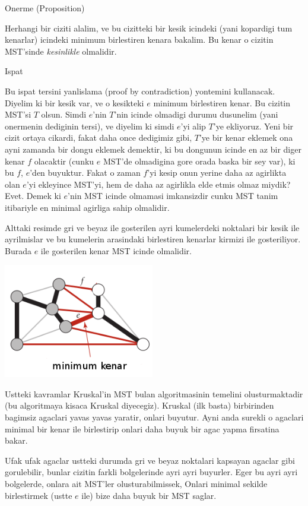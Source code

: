 \documentclass[12pt,fleqn]{article}\usepackage{../common}
\begin{document}
Onerme (Proposition)

Herhangi bir ciziti alalim, ve bu cizitteki bir kesik icindeki (yani
kopardigi tum kenarlar) icindeki minimum birlestiren kenara bakalim. Bu
kenar o cizitin MST'sinde {\em kesinlikle} olmalidir.

Ispat

Bu ispat tersini yanlislama (proof by contradiction) yontemini
kullanacak. Diyelim ki bir kesik var, ve o kesikteki $e$ minimum
birlestiren kenar. Bu cizitin MST'si $T$ olsun. Simdi $e$'nin $T$'nin
icinde olmadigi durumu dusunelim (yani onermenin dediginin tersi), ve
diyelim ki simdi $e$'yi alip $T$'ye ekliyoruz. Yeni bir cizit ortaya
cikardi, fakat daha once dedigimiz gibi, $T$'ye bir kenar eklemek ona ayni
zamanda bir dongu eklemek demektir, ki bu dongunun icinde en az bir diger
kenar $f$ olacaktir (cunku $e$ MST'de olmadigina gore orada baska bir sey
var), ki bu $f$, $e$'den buyuktur. Fakat o zaman $f$'yi kesip onun yerine
daha az agirlikta olan $e$'yi ekleyince MST'yi, hem de daha az agirlikla
elde etmis olmaz miydik? Evet. Demek ki $e$'nin MST icinde olmamasi
imkansizdir cunku MST tanim itibariyle en minimal agirliga sahip olmalidir.

Alttaki resimde gri ve beyaz ile gosterilen ayri kumelerdeki noktalari bir
kesik ile ayrilmislar ve bu kumelerin arasindaki birlestiren kenarlar
kirmizi ile gosteriliyor. Burada $e$ ile gosterilen kenar MST icinde
olmalidir. 

\includegraphics[height=5cm]{cross_edge.png}

Ustteki kavramlar Kruskal'in MST bulan algoritmasinin temelini
olusturmaktadir (bu algoritmaya kisaca Kruskal diyecegiz). Kruskal (ilk
basta) birbirinden bagimsiz agaclari yavas yavas yaratir, onlari
buyutur. Ayni anda surekli o agaclari minimal bir kenar ile birlestirip
onlari daha buyuk bir agac yapma firsatina bakar. 

Ufak ufak agaclar ustteki durumda gri ve beyaz noktalari kapsayan agaclar
gibi gorulebilir, bunlar cizitin farkli bolgelerinde ayri ayri
buyurler. Eger bu ayri ayri bolgelerde, onlara ait MST'ler
olusturabilmissek, Onlari minimal sekilde birlestirmek (ustte $e$ ile) bize
daha buyuk bir MST saglar. 
\end{document}
